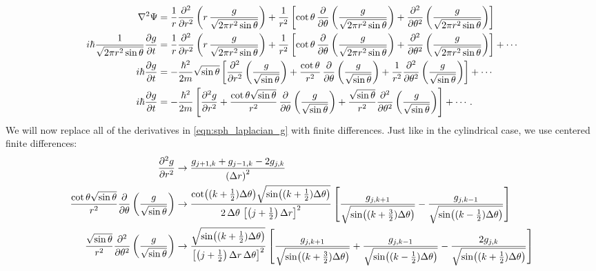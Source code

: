 \documentclass[12pt]{article}
\numberwithin{equation}{section}
\begin{document}
\begin{align}\label{eqn:sph_laplacian_g}
\laplacian{\Psi} &= \frac{1}{r} \pdv[2]{}{r} \left(r \, \frac{g}{\sqrt{2 \pi r^2 \sin{\theta}}}\right) + \frac{1}{r^2} \left[\cot{\theta} \, \pdv{}{\theta}\left(\frac{g}{\sqrt{2 \pi r^2 \sin{\theta}}}\right) + \pdv[2]{}{\theta}\left(\frac{g}{\sqrt{2 \pi r^2 \sin{\theta}}}\right)\right] \nonumber \\
%
i \hbar \frac{1}{\sqrt{2 \pi r^2 \sin\theta}} \pdv{g}{t} &= \frac{1}{r} \pdv[2]{}{r} \left(r \, \frac{g}{\sqrt{2 \pi r^2 \sin{\theta}}}\right) + \frac{1}{r^2} \left[\cot{\theta} \, \pdv{}{\theta}\left(\frac{g}{\sqrt{2 \pi r^2 \sin{\theta}}}\right) + \pdv[2]{}{\theta}\left(\frac{g}{\sqrt{2 \pi r^2 \sin{\theta}}}\right)\right] + \cdots \nonumber \\
%
i \hbar \pdv{g}{t} &= -\frac{\hbar^2}{2m} \sqrt{\sin{\theta}} \left[\pdv[2]{}{r} \left(\frac{g}{\sqrt{\sin{\theta}}}\right) + \frac{\cot{\theta}}{r^2} \, \pdv{}{\theta}\left(\frac{g}{\sqrt{\sin{\theta}}}\right) + \frac{1}{r^2}\pdv[2]{}{\theta}\left(\frac{g}{\sqrt{\sin{\theta}}}\right)\right] + \cdots \nonumber \\
i \hbar \pdv{g}{t} &= -\frac{\hbar^2}{2m} \left[\pdv[2]{g}{r} +\frac{\cot{\theta} \sqrt{\sin{\theta}}}{r^2} \, \pdv{}{\theta}\left(\frac{g}{\sqrt{\sin{\theta}}}\right) + \frac{\sqrt{\sin{\theta}}}{r^2}\pdv[2]{}{\theta}\left(\frac{g}{\sqrt{\sin{\theta}}}\right)\right] + \cdots.
\end{align}
We will now replace all of the derivatives in \eqref{eqn:sph_laplacian_g} with finite differences. Just like in the cylindrical case, we use centered finite differences:
\begin{align}\label{eqn:sph_finite_differences}
\pdv[2]{g}{r} &\rightarrow \frac{g_{j+1, k} + g_{j-1, k} - 2g_{j,k}}{\left(\Delta r\right)^2} \\
%
\frac{\cot{\theta} \sqrt{\sin{\theta}}}{r^2}\pdv{}{\theta}\left(\frac{g}{\sqrt{\sin{\theta}}}\right) &\rightarrow
\frac{\cot((k+\frac{1}{2}) \Delta \theta) \sqrt{\sin((k+\frac{1}{2}) \Delta \theta)}}{2 \, \Delta \theta \, \left[\left(j+\frac{1}{2}\right) \Delta r\right]^2} \left[  \frac{g_{j, k+1}}{\sqrt{\sin((k+\frac{3}{2}) \Delta \theta)}} - \frac{g_{j, k-1}}{\sqrt{\sin((k-\frac{1}{2}) \Delta \theta)}}   \right] \nonumber \\
%
\frac{\sqrt{\sin{\theta}}}{r^2}\pdv[2]{}{\theta}\left(\frac{g}{\sqrt{\sin{\theta}}}\right) &\rightarrow
\frac{\sqrt{\sin((k+\frac{1}{2}) \Delta \theta)}}{\left[\left(j+\frac{1}{2}\right) \Delta r \, \Delta \theta\right]^2} \left[  \frac{g_{j, k+1}}{\sqrt{\sin((k+\frac{3}{2}) \Delta \theta)}} + \frac{g_{j, k-1}}{\sqrt{\sin((k-\frac{1}{2}) \Delta \theta)}} - \frac{2g_{j, k}}{\sqrt{\sin((k+\frac{1}{2}) \Delta \theta)}}  \right] \nonumber
\end{align}
\end{document}
